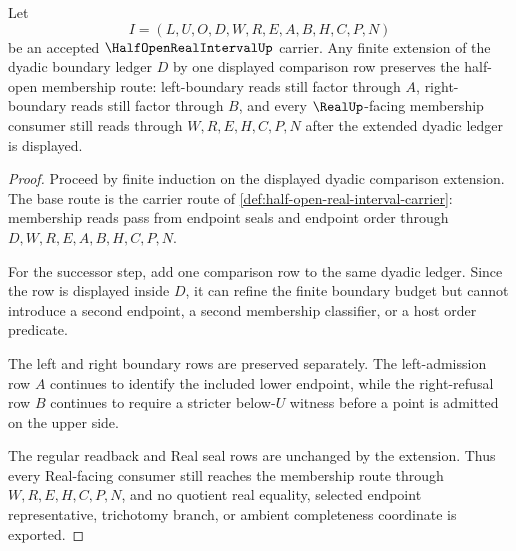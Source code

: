 \begin{theorem}
\label{thm:half-open-real-interval-dyadic-boundary-induction}
Let
$$
I=(L,U,O,D,W,R,E,A,B,H,C,P,N)
$$
be an accepted $\HalfOpenRealIntervalUp$ carrier. Any finite extension of the dyadic boundary ledger $D$ by one displayed comparison row preserves the half-open membership route: left-boundary reads still factor through $A$, right-boundary reads still factor through $B$, and every $\RealUp$-facing membership consumer still reads through $W,R,E,H,C,P,N$ after the extended dyadic ledger is displayed.
\end{theorem}
\begin{proof}
Proceed by finite induction on the displayed dyadic comparison extension. The base route is the carrier route of \autoref{def:half-open-real-interval-carrier}: membership reads pass from endpoint seals and endpoint order through $D,W,R,E,A,B,H,C,P,N$.

For the successor step, add one comparison row to the same dyadic ledger. Since the row is displayed inside $D$, it can refine the finite boundary budget but cannot introduce a second endpoint, a second membership classifier, or a host order predicate.

The left and right boundary rows are preserved separately. The left-admission row $A$ continues to identify the included lower endpoint, while the right-refusal row $B$ continues to require a stricter below-$U$ witness before a point is admitted on the upper side.

The regular readback and Real seal rows are unchanged by the extension. Thus every Real-facing consumer still reaches the membership route through $W,R,E,H,C,P,N$, and no quotient real equality, selected endpoint representative, trichotomy branch, or ambient completeness coordinate is exported.
\end{proof}

